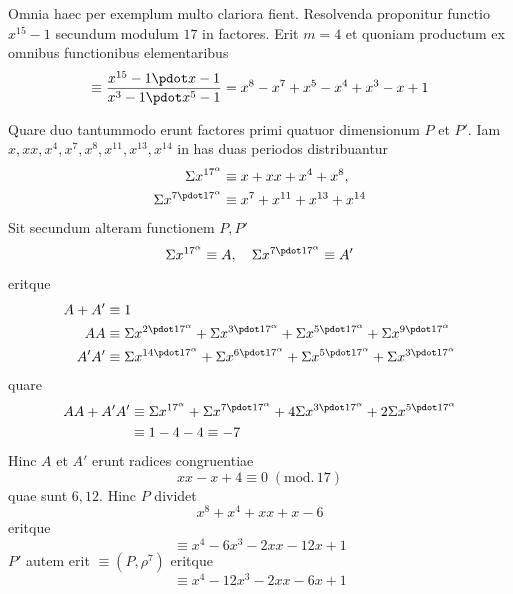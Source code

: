 Omnia haec per exemplum multo clariora fient. Resolvenda proponitur functio $x^{15}-1$ secundum modulum $17$ in factores. Erit $m=4$ et quoniam productum ex omnibus functionibus elementaribus
\[
\equiv\frac{x^{15}-1\pdot x-1}{x^3-1\pdot x^5-1}=x^8-x^7+x^5-x^4+x^3-x+1
\]

Quare duo tantummodo erunt factores primi quatuor dimensionum $P$ et $P'$. Iam $x,xx,x^4,x^7,x^8,x^{11},x^{13},x^{14}$ in has duas periodos distribuantur
\[
\begin{aligned}
\Sigma x^{17^\alpha}&\equiv x+xx+x^4+x^8,\\
\Sigma x^{7\pdot17^\alpha}&\equiv x^7+x^{11}+x^{13}+x^{14}
\end{aligned}
\]
Sit secundum alteram functionem $P,P'$
\[
\Sigma x^{17^\alpha}\equiv A,\quad\Sigma x^{7\pdot17^\alpha}\equiv A'
\]
eritque
\[
\begin{aligned}
A+A'&\equiv1\\
AA&\equiv\Sigma x^{2\pdot17^\alpha}+\Sigma x^{3\pdot17^\alpha}+\Sigma x^{5\pdot17^\alpha}+\Sigma x^{9\pdot17^\alpha}\\
A'A'&\equiv\Sigma x^{14\pdot17^\alpha}+\Sigma x^{6\pdot17^\alpha}+\Sigma x^{5\pdot17^\alpha}+\Sigma x^{3\pdot17^\alpha}
\end{aligned}
\]
quare
\[
\begin{aligned}
AA+A'A'&\equiv\Sigma x^{17^\alpha}+\Sigma x^{7\pdot17^\alpha}+4\Sigma x^{3\pdot17^\alpha}+2\Sigma x^{5\pdot17^\alpha}\\
&\equiv1-4-4\equiv-7
\end{aligned}
\]
Hinc $A$ et $A'$ erunt radices congruentiae
\[
xx-x+4\equiv0\;(\mathrm{mod.}\,17)
\]
quae sunt $6,12$. Hinc $P$ dividet
\[
x^8+x^4+xx+x-6
\]
eritque
\[
\equiv x^4-6x^3-2xx-12x+1
\]
$P'$ autem erit $\equiv(P,\rho^7)$ eritque
\[
\equiv x^4-12x^3-2xx-6x+1
\]
